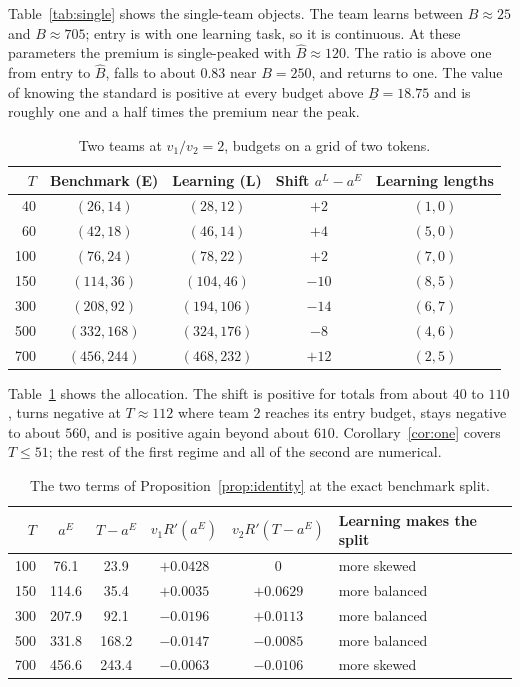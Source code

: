 \documentclass[11pt]{article}
\theoremstyle{definition}
\begin{document}
Table~\ref{tab:single} shows the single-team objects. The team learns between $B\approx25$ and $B\approx705$; entry is with one learning task, so it is continuous. At these parameters the premium is single-peaked with $\hat B\approx120$. The ratio is above one from entry to $\hat B$, falls to about $0.83$ near $B=250$, and returns to one. The value of knowing the standard is positive at every budget above $\underline B=18.75$ and is roughly one and a half times the premium near the peak.

\begin{table}[htbp]
\centering
\small
\setlength{\tabcolsep}{5pt}
\begin{tabular}{@{}rcccc@{}}
\toprule
$T$ & Benchmark (E) & Learning (L) & Shift $a^L-a^E$ & Learning lengths \\
\midrule
40  & $(26,14)$   & $(28,12)$   & $+2$  & $(1,0)$ \\
60  & $(42,18)$   & $(46,14)$   & $+4$  & $(5,0)$ \\
100 & $(76,24)$   & $(78,22)$   & $+2$  & $(7,0)$ \\
150 & $(114,36)$  & $(104,46)$  & $-10$ & $(8,5)$ \\
300 & $(208,92)$  & $(194,106)$ & $-14$ & $(6,7)$ \\
500 & $(332,168)$ & $(324,176)$ & $-8$  & $(4,6)$ \\
700 & $(456,244)$ & $(468,232)$ & $+12$ & $(2,5)$ \\
\bottomrule
\end{tabular}
\caption{Two teams at $v_1/v_2=2$, budgets on a grid of two tokens.}
\label{tab:alloc}
\end{table}

Table~\ref{tab:alloc} shows the allocation. The shift is positive for totals from about $40$ to $110$, turns negative at $T\approx112$ where team 2 reaches its entry budget, stays negative to about $560$, and is positive again beyond about $610$. Corollary~\ref{cor:one} covers $T\le51$; the rest of the first regime and all of the second are numerical.

\begin{table}[htbp]
\centering
\small
\setlength{\tabcolsep}{5pt}
\begin{tabular}{@{}rccccl@{}}
\toprule
$T$ & $a^E$ & $T-a^E$ & $v_1R'(a^E)$ & $v_2R'(T-a^E)$ & Learning makes the split \\
\midrule
100 & 76.1  & 23.9  & $+0.0428$ & $0$       & more skewed \\
150 & 114.6 & 35.4  & $+0.0035$ & $+0.0629$ & more balanced \\
300 & 207.9 & 92.1  & $-0.0196$ & $+0.0113$ & more balanced \\
500 & 331.8 & 168.2 & $-0.0147$ & $-0.0085$ & more balanced \\
700 & 456.6 & 243.4 & $-0.0063$ & $-0.0106$ & more skewed \\
\bottomrule
\end{tabular}
\caption{The two terms of Proposition~\ref{prop:identity} at the exact benchmark split.}
\label{tab:direction}
\end{table}
\end{document}
